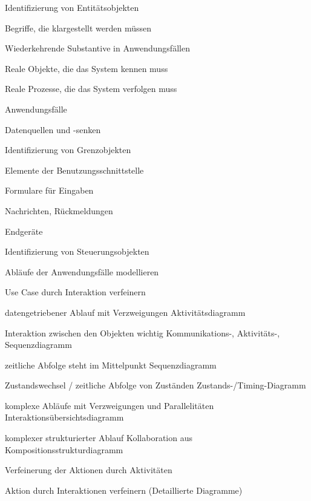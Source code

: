 \documentclass[a4paper]{article}
\begin{document}
\begin{multicols}{3}
\begin{itemize*}
\begin{description*}
    \end{description*}
    \item Identifizierung von Entitätsobjekten
    \begin{itemize*}
      \item Begriffe, die klargestellt werden müssen
      \item Wiederkehrende Substantive in Anwendungsfällen
      \item Reale Objekte, die das System kennen muss
      \item Reale Prozesse, die das System verfolgen muss
      \item Anwendungsfälle
      \item Datenquellen und -senken
    \end{itemize*}
    \item Identifizierung von Grenzobjekten
    \begin{itemize*}
      \item Elemente der Benutzungsschnittstelle
      \item Formulare für Eingaben
      \item Nachrichten, Rückmeldungen
      \item Endgeräte
    \end{itemize*}
    \item Identifizierung von Steuerungsobjekten
    \item Abläufe der Anwendungsfälle modellieren
    \item Use Case durch Interaktion verfeinern
    \begin{description*}
      \item[datengetriebener Ablauf mit Verzweigungen] Aktivitätsdiagramm
      \item[Interaktion zwischen den Objekten wichtig] Kommunikations-, Aktivitäts-, Sequenzdiagramm
      \item[zeitliche Abfolge steht im Mittelpunkt] Sequenzdiagramm
      \item[Zustandswechsel / zeitliche Abfolge von Zuständen] Zustands-/Timing-Diagramm
      \item[komplexe Abläufe mit Verzweigungen und Parallelitäten] Interaktionsübersichtsdiagramm
      \item[komplexer strukturierter Ablauf] Kollaboration aus Kompositionsstrukturdiagramm
    \end{description*}
    \item Verfeinerung der Aktionen durch Aktivitäten
    \item Aktion durch Interaktionen verfeinern (Detaillierte Diagramme)

\end{itemize*}
\end{multicols}
\end{document}
